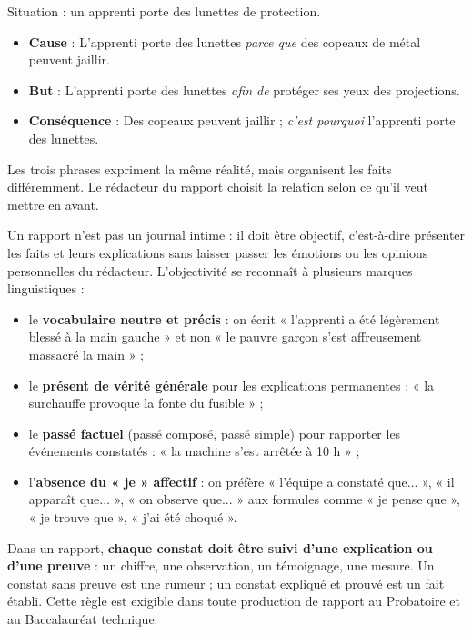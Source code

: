 \documentclass[11pt]{article}
\newcommand{\cle}[1]{{\popxbold\color{popdark}#1}}
\newcounter{popsec}
\newcounter{popsub}
\newcommand{\courssub}[1]{%
  \stepcounter{popsub}%
  \par\vspace{9pt}\noindent{\popxbold\fontsize{11.5}{13}\selectfont\color{popink}{\color{poporange}\thepopsec.\thepopsub}\hspace{6pt}#1}\par\nopagebreak\vspace{4pt}
}
\begin{document}
\begin{exemplebox}
Situation : un apprenti porte des lunettes de protection.
\begin{itemize}
\item \textbf{Cause} : L'apprenti porte des lunettes \emph{parce que} des copeaux de métal peuvent jaillir.
\item \textbf{But} : L'apprenti porte des lunettes \emph{afin de} protéger ses yeux des projections.
\item \textbf{Conséquence} : Des copeaux peuvent jaillir ; \emph{c'est pourquoi} l'apprenti porte des lunettes.
\end{itemize}
Les trois phrases expriment la même réalité, mais organisent les faits différemment. Le rédacteur du rapport choisit la relation selon ce qu'il veut mettre en avant.
\end{exemplebox}

\courssub{Les marques d'objectivité}

Un rapport n'est pas un journal intime : il doit être \cle{objectif}, c'est-à-dire présenter les faits et leurs explications sans laisser passer les émotions ou les opinions personnelles du rédacteur. L'objectivité se reconnaît à plusieurs marques linguistiques :

\begin{itemize}
\item le \textbf{vocabulaire neutre et précis} : on écrit « l'apprenti a été légèrement blessé à la main gauche » et non « le pauvre garçon s'est affreusement massacré la main » ;
\item le \textbf{présent de vérité générale} pour les explications permanentes : « la surchauffe provoque la fonte du fusible » ;
\item le \textbf{passé factuel} (passé composé, passé simple) pour rapporter les événements constatés : « la machine s'est arrêtée à 10 h » ;
\item l'\textbf{absence du « je » affectif} : on préfère « l'équipe a constaté que... », « il apparaît que... », « on observe que... » aux formules comme « je pense que », « je trouve que », « j'ai été choqué ».
\end{itemize}

\begin{propriete}
Dans un rapport, \textbf{chaque constat doit être suivi d'une explication ou d'une preuve} : un chiffre, une observation, un témoignage, une mesure. Un constat sans preuve est une rumeur ; un constat expliqué et prouvé est un fait établi. Cette règle est exigible dans toute production de rapport au Probatoire et au Baccalauréat technique.
\end{propriete}
\end{document}
